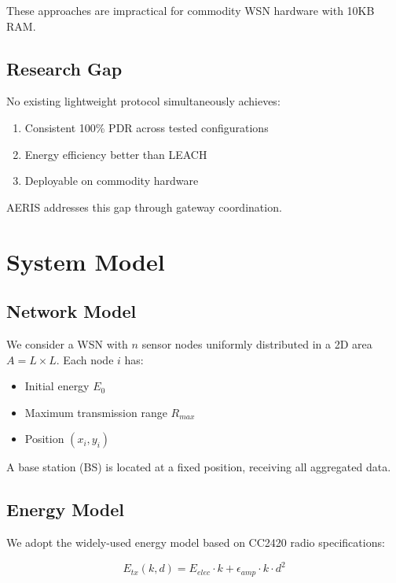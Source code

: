 \documentclass[twocolumn]{article}
\begin{document}
These approaches are impractical for commodity WSN hardware with 10KB RAM.

\subsection{Research Gap}

No existing lightweight protocol simultaneously achieves:
\begin{enumerate}
    \item Consistent 100\% PDR across tested configurations
    \item Energy efficiency better than LEACH
    \item Deployable on commodity hardware
\end{enumerate}

AERIS addresses this gap through gateway coordination.

\section{System Model}
\label{sec:system}

\subsection{Network Model}

We consider a WSN with $n$ sensor nodes uniformly distributed in a 2D area
$A = L \times L$. Each node $i$ has:
\begin{itemize}
    \item Initial energy $E_0$
    \item Maximum transmission range $R_{max}$
    \item Position $(x_i, y_i)$
\end{itemize}

A base station (BS) is located at a fixed position, receiving all aggregated
data.

\subsection{Energy Model}

We adopt the widely-used energy model based on CC2420 radio specifications:

\begin{equation}
E_{tx}(k, d) = E_{elec} \cdot k + \epsilon_{amp} \cdot k \cdot d^2
\end{equation}
\end{document}
